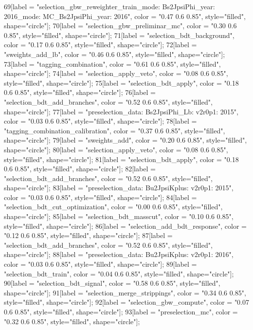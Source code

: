 {	69[label = "selection_gbw_reweighter_train\ndata_mode: Bs2JpsiPhi\ndata_year: 2016\nmc_mode: MC_Bs2JpsiPhi\nmc_year: 2016", color = "0.47 0.6 0.85", style="filled", shape="circle"];
	70[label = "selection_gbw_preliminar_mc", color = "0.30 0.6 0.85", style="filled", shape="circle"];
	71[label = "selection_bdt_background", color = "0.17 0.6 0.85", style="filled", shape="circle"];
	72[label = "sweights_add_lb", color = "0.46 0.6 0.85", style="filled", shape="circle"];
	73[label = "tagging_combination", color = "0.61 0.6 0.85", style="filled", shape="circle"];
	74[label = "selection_apply_veto", color = "0.08 0.6 0.85", style="filled", shape="circle"];
	75[label = "selection_bdt_apply", color = "0.18 0.6 0.85", style="filled", shape="circle"];
	76[label = "selection_bdt_add_branches", color = "0.52 0.6 0.85", style="filled", shape="circle"];
	77[label = "preselection_data\nmode: Bs2JpsiPhi_Lb\nversion: v2r0p1\nyear: 2015", color = "0.03 0.6 0.85", style="filled", shape="circle"];
	78[label = "tagging_combination_calibration", color = "0.37 0.6 0.85", style="filled", shape="circle"];
	79[label = "sweights_add", color = "0.20 0.6 0.85", style="filled", shape="circle"];
	80[label = "selection_apply_veto", color = "0.08 0.6 0.85", style="filled", shape="circle"];
	81[label = "selection_bdt_apply", color = "0.18 0.6 0.85", style="filled", shape="circle"];
	82[label = "selection_bdt_add_branches", color = "0.52 0.6 0.85", style="filled", shape="circle"];
	83[label = "preselection_data\nmode: Bu2JpsiKplus\nversion: v2r0p1\nyear: 2015", color = "0.03 0.6 0.85", style="filled", shape="circle"];
	84[label = "selection_bdt_cut_optimization", color = "0.00 0.6 0.85", style="filled", shape="circle"];
	85[label = "selection_bdt_masscut", color = "0.10 0.6 0.85", style="filled", shape="circle"];
	86[label = "selection_add_bdt_response", color = "0.12 0.6 0.85", style="filled", shape="circle"];
	87[label = "selection_bdt_add_branches", color = "0.52 0.6 0.85", style="filled", shape="circle"];
	88[label = "preselection_data\nmode: Bu2JpsiKplus\nversion: v2r0p1\nyear: 2016", color = "0.03 0.6 0.85", style="filled", shape="circle"];
	89[label = "selection_bdt_train", color = "0.04 0.6 0.85", style="filled", shape="circle"];
	90[label = "selection_bdt_signal", color = "0.58 0.6 0.85", style="filled", shape="circle"];
	91[label = "selection_merge_strippings", color = "0.34 0.6 0.85", style="filled", shape="circle"];
	92[label = "selection_gbw_compute", color = "0.07 0.6 0.85", style="filled", shape="circle"];
	93[label = "preselection_mc", color = "0.32 0.6 0.85", style="filled", shape="circle"];
}

